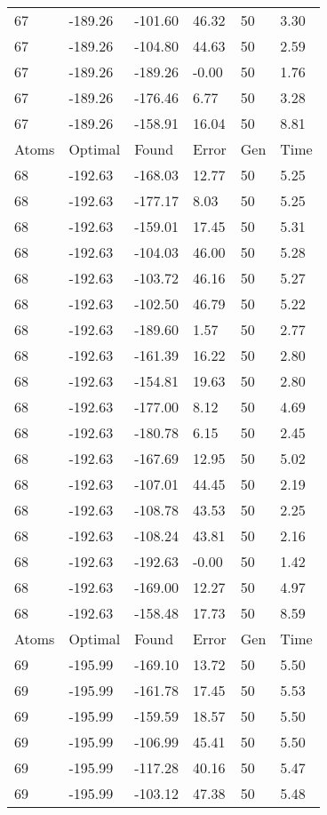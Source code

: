 \documentclass{report}
\begin{document}
\begin{appendix}
\begin{longtable}{llllll}
67 & -189.26 & -101.60 & 46.32 & 50 & 3.30 \\
67 & -189.26 & -104.80 & 44.63 & 50 & 2.59 \\
67 & -189.26 & -189.26 & -0.00 & 50 & 1.76 \\
67 & -189.26 & -176.46 & 6.77 & 50 & 3.28 \\
67 & -189.26 & -158.91 & 16.04 & 50 & 8.81 \\
Atoms & Optimal & Found & Error & Gen & Time \\
68 & -192.63 & -168.03 & 12.77 & 50 & 5.25 \\
68 & -192.63 & -177.17 & 8.03 & 50 & 5.25 \\
68 & -192.63 & -159.01 & 17.45 & 50 & 5.31 \\
68 & -192.63 & -104.03 & 46.00 & 50 & 5.28 \\
68 & -192.63 & -103.72 & 46.16 & 50 & 5.27 \\
68 & -192.63 & -102.50 & 46.79 & 50 & 5.22 \\
68 & -192.63 & -189.60 & 1.57 & 50 & 2.77 \\
68 & -192.63 & -161.39 & 16.22 & 50 & 2.80 \\
68 & -192.63 & -154.81 & 19.63 & 50 & 2.80 \\
68 & -192.63 & -177.00 & 8.12 & 50 & 4.69 \\
68 & -192.63 & -180.78 & 6.15 & 50 & 2.45 \\
68 & -192.63 & -167.69 & 12.95 & 50 & 5.02 \\
68 & -192.63 & -107.01 & 44.45 & 50 & 2.19 \\
68 & -192.63 & -108.78 & 43.53 & 50 & 2.25 \\
68 & -192.63 & -108.24 & 43.81 & 50 & 2.16 \\
68 & -192.63 & -192.63 & -0.00 & 50 & 1.42 \\
68 & -192.63 & -169.00 & 12.27 & 50 & 4.97 \\
68 & -192.63 & -158.48 & 17.73 & 50 & 8.59 \\
Atoms & Optimal & Found & Error & Gen & Time \\
69 & -195.99 & -169.10 & 13.72 & 50 & 5.50 \\
69 & -195.99 & -161.78 & 17.45 & 50 & 5.53 \\
69 & -195.99 & -159.59 & 18.57 & 50 & 5.50 \\
69 & -195.99 & -106.99 & 45.41 & 50 & 5.50 \\
69 & -195.99 & -117.28 & 40.16 & 50 & 5.47 \\
69 & -195.99 & -103.12 & 47.38 & 50 & 5.48 \\

\end{longtable}
\end{appendix}
\end{document}
